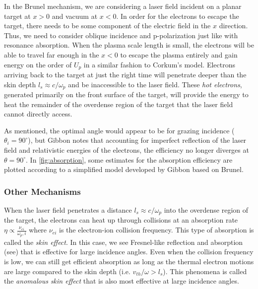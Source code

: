 In the Brunel mechanism\cite{Brunel_1987_PRL}, we are considering a laser field incident on a planar target at $x > 0$ and vacuum at $x < 0$. In order for the electrons to escape the target, there needs to be some component of the electric field in the $x$ direction. Thus, we need to consider oblique incidence and p-polarization just like with resonance absorption. When the plasma scale length is small, the electrons will be able to travel far enough in the $x < 0$ to escape the plasma entirely and gain energy on the order of $U_p$ in a similar fashion to Corkum's model\cite{Corkum_1993_PRL}. Electrons arriving back to the target at just the right time will penetrate deeper than the skin depth $l_s \approx c / \omega_p$ and be inaccessible to the laser field\cite{Gibbon_2005_Plasma}. These \emph{hot electrons}, generated primarily on the front surface of the target, will provide the energy to heat the remainder of the overdense region of the target that the laser field cannot directly access. 

As mentioned, the optimal angle would appear to be for grazing incidence ($\theta_i = 90^\circ$), but Gibbon notes that accounting for imperfect reflection of the laser field and relativistic energies of the electrons, the efficiency no longer diverges at $\theta = 90^\circ$\cite{Gibbon_2005_Plasma}. In \cref{fig:absorption}, some estimates for the absorption efficiency are plotted according to a simplified model developed by Gibbon\cite{Gibbon_2005_Plasma} based on Brunel\cite{Brunel_1987_PRL}.

\subsubsection{Other Mechanisms}
When the laser field penetrates a distance $l_s \approx c / \omega_p$ into the overdense region of the target, the electrons can heat up through collisions at an absorption rate $\eta \propto \frac{\nu_{ei}}{\omega_p,i}$\cite{Gibbon_2005_Plasma} where $\nu_{ei}$ is the electron-ion collision frequency. This type of absorption is called the \emph{skin effect}. In this case, we see Fresnel-like reflection and absorption (see\cite{Griffiths_2017}) that is effective for large incidence angles. Even when the collision frequency is low, we can still get efficient absorption as long as the thermal electron motions are large compared to the skin depth (i.e. $v_{th}/\omega > l_s$)\cite{Gibbon_2005_Plasma}. This phenomena is called the \emph{anomalous skin effect} that is also most effective at large incidence angles. 

